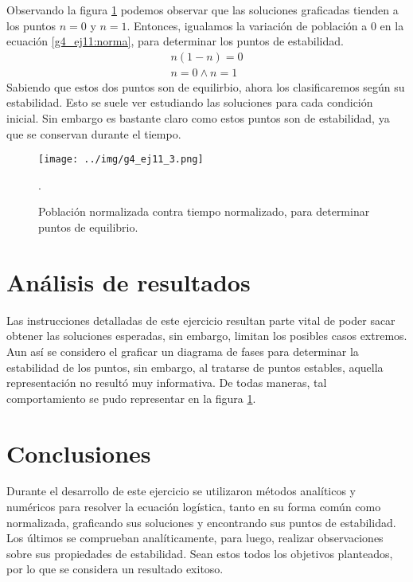 \documentclass[../portafolio.tex]{subfiles}
\begin{document}
Observando la figura \ref{g4_ej11:11_graf_2} podemos observar que las soluciones graficadas tienden a los puntos $n=0$ y $n=1$.	
Entonces, igualamos la variación de población a $0$ en la ecuación \eqref{g4_ej11:norma}, para determinar los puntos de estabilidad.
\begin{align}
n(1-n)=0\\
n=0 \wedge n=1
\end{align}
Sabiendo que estos dos puntos son de equilirbio, ahora los clasificaremos según su estabilidad. Esto se suele ver estudiando las soluciones para cada condición inicial. Sin embargo es bastante claro como estos puntos son de estabilidad, ya que se conservan durante el tiempo.

\begin{figure}
\centering
\texttt{[image: ../img/g4\_ej11\_3.png]} 
\caption{Población normalizada contra tiempo normalizado, para determinar puntos de equilibrio. }\label{g4_ej11:11_graf_2}.
\end{figure}

\section{Análisis de resultados}
Las instrucciones detalladas de este ejercicio resultan parte vital de poder sacar obtener las soluciones esperadas, sin embargo, limitan los posibles casos extremos. Aun así se considero el graficar un diagrama de fases para determinar la estabilidad de los puntos, sin embargo, al tratarse de puntos estables, aquella representación no resultó muy informativa. De todas maneras, tal comportamiento se pudo representar en la figura \ref{g4_ej11:11_graf_2}. 
\section*{Conclusiones}
Durante el desarrollo de este ejercicio se utilizaron métodos analíticos  y numéricos para resolver la ecuación logística, tanto en su forma común como normalizada, graficando sus soluciones y encontrando sus puntos de estabilidad. Los últimos se comprueban analíticamente, para luego, realizar observaciones sobre sus propiedades de estabilidad. Sean estos todos los objetivos planteados, por lo que se considera un resultado exitoso.
\end{document}
